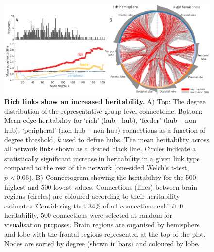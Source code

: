\begin{figure}[h!]
\begin{center}
\includegraphics[width=1\textwidth]{Chapter5/Ch5Fig4.pdf}%
\end{center}
\caption{\textbf{Rich links show an increased heritability.}
A) Top: The degree distribution of the representative group-level connectome. Bottom: Mean edge heritability for `rich' (hub - hub), `feeder' (hub – non-hub), `peripheral' (non-hub – non-hub) connections as a function of degree threshold, \textit{k} used to define hubs. The mean heritability across all network links shown as a dotted black line. Circles indicate a statistically significant increase in heritability in a given link type compared to the rest of the network (one-sided Welch’s t-test, $p < 0.05$). B) Connectogram showing the heritability for the 500 highest and 500 lowest values. Connections (lines) between brain regions (circles) are coloured according to their heritability estimates. Considering that $34\%$ of all connections exhibit 0 heritability, 500 connections were selected at random for visualisation purposes. Brain regions are organised by hemisphere and lobe with the frontal regions represented at the top of the plot. Nodes are sorted by degree (shown in bars) and coloured by lobe.}
\label{fig:Ch5Fig4}
\end{figure}

